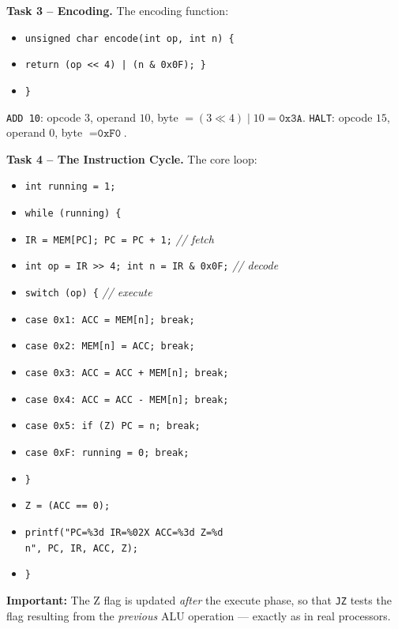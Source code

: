 \documentclass[11pt]{article}
\begin{document}
\textbf{Task 3 -- Encoding.}
The encoding function:
\begin{itemize}
\item \texttt{unsigned char encode(int op, int n) \{}
\item \texttt{\quad return (op << 4) | (n \& 0x0F); \}}
\item \texttt{\}}
\end{itemize}
\texttt{ADD 10}: opcode $3$, operand $10$, byte $= (3 \ll 4) \mathbin{|} 10 = \texttt{0x3A}$.
\texttt{HALT}: opcode $15$, operand $0$, byte $= \texttt{0xF0}$.

\textbf{Task 4 -- The Instruction Cycle.}
The core loop:
\begin{itemize}
\item \texttt{int running = 1;}
\item \texttt{while (running) \{}
\item \texttt{\quad IR = MEM[PC]; PC = PC + 1;} \hfill \emph{// fetch}
\item \texttt{\quad int op = IR >> 4; int n = IR \& 0x0F;} \hfill \emph{// decode}
\item \texttt{\quad switch (op) \{} \hfill \emph{// execute}
\item \texttt{\quad\quad case 0x1: ACC = MEM[n]; break;}
\item \texttt{\quad\quad case 0x2: MEM[n] = ACC; break;}
\item \texttt{\quad\quad case 0x3: ACC = ACC + MEM[n]; break;}
\item \texttt{\quad\quad case 0x4: ACC = ACC - MEM[n]; break;}
\item \texttt{\quad\quad case 0x5: if (Z) PC = n; break;}
\item \texttt{\quad\quad case 0xF: running = 0; break;}
\item \texttt{\quad \}}
\item \texttt{\quad Z = (ACC == 0);}
\item \texttt{\quad printf("PC=\%3d IR=\%02X ACC=\%3d Z=\%d\\n", PC, IR, ACC, Z);}
\item \texttt{\}}
\end{itemize}
\textbf{Important:} The Z flag is updated \emph{after} the execute phase, so that \texttt{JZ} tests the flag resulting from the \emph{previous} ALU operation — exactly as in real processors.
\end{document}

